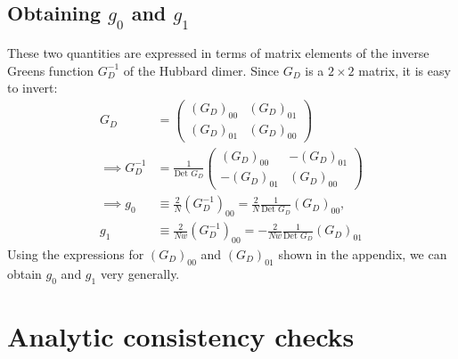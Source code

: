 \documentclass[12pt]{article}
\numberwithin{equation}{section}
\begin{document}
\subsection{Obtaining \(g_0\) and \(g_1\)}
These two quantities are expressed in terms of matrix elements of the inverse Greens function \(G_D^{-1}\) of the Hubbard dimer. Since \(G_D\) is a \(2\times 2\) matrix, it is easy to invert:
\begin{equation}\begin{aligned}
	G_D &= \begin{pmatrix} \left(G_D\right)_{00} &  \left(G_D\right)_{01} \\ \left(G_D\right)_{01} & \left(G_D\right)_{00}\end{pmatrix} \\
	\implies G_D^{-1} &= \frac{1}{\text{Det }G_D}\begin{pmatrix} \left(G_D\right)_{00} &  -\left(G_D\right)_{01} \\ -\left(G_D\right)_{01} & \left(G_D\right)_{00}\end{pmatrix}\\
		 \implies g_0 &\equiv\frac{2}{N} (G^{-1}_{D})_{00} = \frac{2}{N} \frac{1}{\text{Det }G_D}\left(G_D\right)_{00},\\
		 g_1 &\equiv\frac{2}{Nw} (G^{-1}_{D})_{00} = -\frac{2}{Nw}\frac{1}{\text{Det }G_D}\left(G_D\right)_{01} 
\end{aligned}\end{equation}
Using the expressions for $(G_{D})_{00}$ and $(G_{D})_{01}$ shown in the appendix, we can obtain $g_{0}$ and $g_{1}$ very generally. 

\section{Analytic consistency checks}
\end{document}
